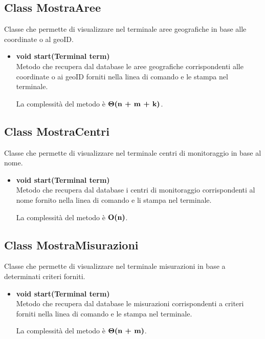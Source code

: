 \documentclass[a4paper, 12pt]{scrreprt}
\begin{document}
			\subsection{Class MostraAree}
			Classe che permette di visualizzare nel terminale aree geografiche in base alle coordinate o al geoID.
			\begin{itemize}
				\item \textbf{void start(Terminal term)}
				\\Metodo che recupera dal database le aree geografiche corrispondenti alle coordinate o ai geoID forniti nella linea di comando e le stampa nel terminale.
				
				La complessit\`a del metodo \`e $\mathbf{\Theta}\textbf{(n + m + k)}$.
				
			\end{itemize}
			
			\subsection{Class MostraCentri}
			Classe che permette di visualizzare nel terminale centri di monitoraggio in base al nome.
			\begin{itemize}
				\item \textbf{void start(Terminal term)}
				\\Metodo che recupera dal database i centri di monitoraggio corrispondenti al nome fornito nella linea di comando e li stampa nel terminale.
				
				La complessit\`a del metodo \`e $\mathbf{O}\textbf{(n)}$.
				
			\end{itemize}
			
			\subsection{Class MostraMisurazioni}
			Classe che permette di visualizzare nel terminale misurazioni in base a determinati criteri forniti.
			\begin{itemize}
				\item \textbf{void start(Terminal term)}
				\\Metodo che recupera dal database le misurazioni corrispondenti a criteri forniti nella linea di comando e le stampa nel terminale.
				
				La complessit\`a del metodo \`e $\mathbf{\Theta}\textbf{(n + m)}$.
				
			\end{itemize}
\end{document}
